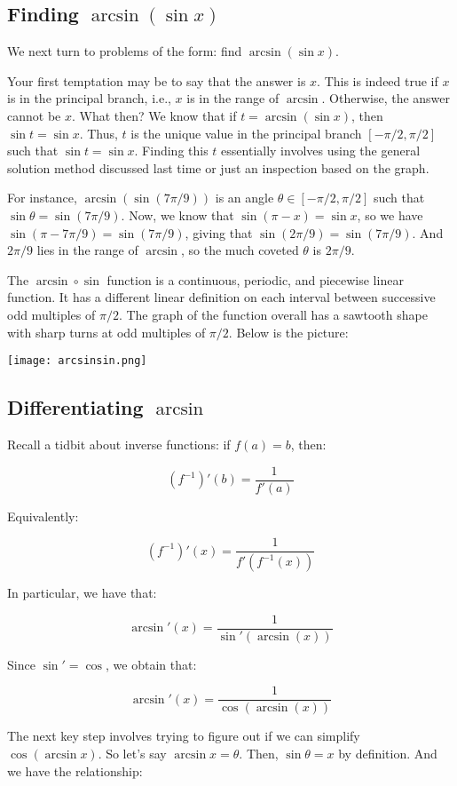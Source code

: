 \documentclass{amsart}
\begin{document}
\subsection{Finding $\arcsin(\sin x)$}

We next turn to problems of the form: find $\arcsin(\sin x)$.

Your first temptation may be to say that the answer is $x$. This is
indeed true if $x$ is in the principal branch, i.e., $x$ is in the
range of $\arcsin$. Otherwise, the answer cannot be $x$. What then? We
know that if $t = \arcsin(\sin x)$, then $\sin t = \sin x$. Thus, $t$
is the unique value in the principal branch $[-\pi/2,\pi/2]$ such that
$\sin t = \sin x$. Finding this $t$ essentially involves using the
general solution method discussed last time or just an inspection based on the graph.

For instance, $\arcsin(\sin(7\pi/9))$ is an angle $\theta \in
[-\pi/2,\pi/2]$ such that $\sin \theta = \sin(7\pi/9)$. Now, we know
that $\sin(\pi - x) = \sin x$, so we have $\sin(\pi - 7\pi/9) =
\sin(7\pi/9)$, giving that $\sin(2\pi/9) = \sin(7\pi/9)$. And $2\pi/9$
lies in the range of $\arcsin$, so the much coveted $\theta$ is
$2\pi/9$.

The $\arcsin \circ \sin$ function is a continuous, periodic, and
piecewise linear function. It has a different linear definition on
each interval between successive odd multiples of $\pi/2$. The graph
of the function overall has a sawtooth shape with sharp turns at odd
multiples of $\pi/2$. Below is the picture:

\texttt{[image: arcsinsin.png]}

\subsection{Differentiating $\arcsin$}

Recall a tidbit about inverse functions: if $f(a) = b$, then:

$$(f^{-1})'(b) = \frac{1}{f'(a)}$$

Equivalently:

$$(f^{-1})'(x) = \frac{1}{f'(f^{-1}(x))}$$

In particular, we have that:

$$\arcsin'(x) = \frac{1}{\sin'(\arcsin(x))}$$

Since $\sin' = \cos$, we obtain that:

$$\arcsin'(x) = \frac{1}{\cos(\arcsin(x))}$$

The next key step involves trying to figure out if we can simplify
$\cos(\arcsin x)$. So let's say $\arcsin x = \theta$. Then, $\sin
\theta = x$ by definition. And we have the relationship:
\end{document}
